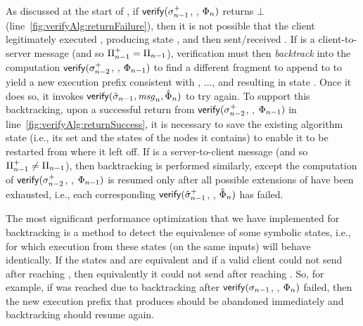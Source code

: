 As discussed at the start of , if
$\mathsf{verify}(\sigma^{+}_{n-1}$, \msg{\msgNmbr},
$\Phi_{n})$ returns $\bot$
(line~\ref{fig:verifyAlg:returnFailure}), then it is not possible that
the client legitimately executed , producing
state , and then sent/received \msg{\msgNmbr}.
If  is a client-to-server message (and so
$\Pi^{+}_{n-1} = \Pi_{n-1}$), verification
must then \textit{backtrack} into the computation
$\mathsf{verify}(\sigma^{+}_{n-2}$, ,
$\Phi_{n-1})$ to find a different fragment to append
to  to yield a new execution prefix
 consistent with , $\ldots$,
 and resulting in state .
Once it does so, it invokes $\mathsf{verify}(\hat{\sigma}_{n-1},
\mathit{msg}_{n}, \hat{\Phi}_{n})$ to try again.  To support
this backtracking, upon a successful return from
$\mathsf{verify}(\sigma^{+}_{n-2}$, ,
$\Phi_{n-1})$ in
line~\ref{fig:verifyAlg:returnSuccess}, it is necessary to save the
existing algorithm state (i.e., its \liveSet set and the states of the
nodes it contains) to enable it to be restarted from where it left
off.  If  is a server-to-client message (and so
$\Pi^{+}_{n-1} \neq \Pi_{n-1}$), then
backtracking is performed similarly, except the computation of
$\mathsf{verify}(\sigma^{+}_{n-2}$, ,
$\Phi_{n-1})$ is resumed only after all possible
extensions  of 
have been exhausted, i.e., each corresponding
$\mathsf{verify}(\hat{\sigma}^{+}_{n-1}$, \msg{\msgNmbr},
$\hat{\Phi}_{n})$ has failed.

The most significant performance optimization that we have implemented
for backtracking is a method to detect the equivalence of some
symbolic states, i.e., for which execution from these states (on the
same inputs) will behave identically.  If the states
 and  are equivalent and
if a valid client could not send \msg{\msgNmbr} after reaching
, then equivalently it could not send
\msg{\msgNmbr} after reaching .  So, for
example, if  was reached due to backtracking
after $\mathsf{verify}(\sigma_{n-1}$, \msg{\msgNmbr},
$\Phi_{n})$ failed, then the new execution prefix
 that produces 
should be abandoned immediately and backtracking should resume again.

